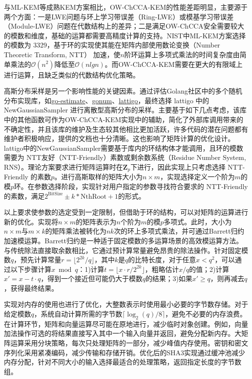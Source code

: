 与ML-KEM等成熟KEM方案相比，OW-ChCCA-KEM的性能差距明显，主要源于两个方面：一是LWE问题与环上学习带误差（Ring-LWE）或模基学习带误差（Module-LWE）问题在代数结构上的差异；二是满足OW-ChCCA安全需要较大的模数和维度，基础的运算都需要高精度计算的支持。NIST中ML-KEM方案选择的模数为 3329，基于环的实现使其能在矩阵内部使用数论变换（Number Theoretic Transform, NTT） 加速，使$n$阶环运算上多项式乘法的时间复杂度由简单乘法的$\mathcal{O}{(n^2)}$降低至$\mathcal{O}{(nlgn)}$。而OW-ChCCA-KEM需要在更大的有限域上进行运算，且缺乏类似的代数结构优化策略。

高斯分布采样是另一个影响性能的关键因素。通过评估Golang社区中的多个随机分布实现库，如\href{https://github.com/milosgajdos/go-estimate}{go-estimate}、\href{https://github.com/gonum/gonum}{gonum}、\href{https://github.com/tuneinsight/lattigo}{lattigo}，最终选择 lattigo 中的 NewGaussianSampler 进行离散型高斯分布的采样。主要基于如下几点考虑，该库中的其他函数可作为OW-ChCCA-KEM实现中的辅助，简化了外部库调用带来的不确定性，并且该库的维护及生态较其他相比更加活跃，许多代码的潜在问题都有维护者积极响应，提供的文档也十分清晰。这也影响了矩阵计算的优化设计。lattigo中的NewGaussianSampler需要基于库内的环结构体才能调用，且环的模数需要为 NTT友好（NTT-Friendly）素数或剩余数系统（Residue Number System, RNS）。理论方案要求进行矩阵运算时在$\mathbf{Z}_p$下进行，因此实现上只考虑选择 NTT-Friendly 的素数$p$。进行高斯取样的矩阵大小为$n \times m$，实现选择定义一个阶为$m$的模$p$环。在参数选择阶段，实现针对用户指定的参数寻找符合要求的 NTT-Friendly 的素数，满足$2^\text{BitSize} ± k * \text{NthRoot} + 1$的形式。

以上要求使参数的选定受到一定限制，但借助于环的结构，可以对矩阵的运算进行新的优化。实现将$n \times m$的矩阵表示为$n$个阶为$m$的模$p$多项式。此时，大小为$n\times m$与$m \times k$的矩阵乘法被转化为$nk$次的环上多项式乘法，并可通过Barrett归约加速模运算\cite{r_omondi_modular_2020}。Barrett归约是一种适于固定模数的多运算场景的高效模运算方法。与传统除法直接取余数相比，它通过预计算常量避免昂贵的除法操作。针对固定模数$q$，预先计算常量$r = \lfloor 2^{2k}/q \rfloor$，其中$k$是$q$的比特长度，对于任意$x < q^2$，可以通过以下步骤计算$x \bmod q$：1)计算$t = \lfloor x \cdot r / 2^{2k} \rfloor$，粗略估计$x/q$的值；2)计算$x' = x - t \cdot q$，得到一个接近但可能仍大于模数$q$的结果；3)如果$x' \geq q$，则再减去$q$，获得最终结果。

实现对内存的使用也进行了优化，大整数表示时使用最小必要的字节数存储。对于给定模数$q$，系统自动计算所需的字节数$\lceil\log_2(q)/8\rceil$，避免不必要的内存浪费。在计算环节，矩阵和向量运算尽可能在原地进行，减少临时对象创建。例如，向量加法操作可选的将结果直接写入其中一个输入向量并返回，避免分配新内存。大矩阵运算采用分块策略，每次只处理矩阵的一部分，减少峰值内存使用。密钥和密文序列化采用紧凑编码，减少传输和存储开销。优化后的SHA3实现通过缓冲池减少内存分配，针对不同大小的输入选择最适合的处理策略，返回指定长度的字节数组。

